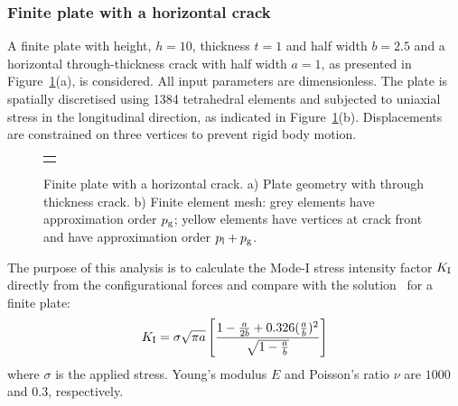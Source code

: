 \documentclass[onecolumn]{svjour3}
\begin{document}
\subsubsection{Finite plate with a horizontal crack}\label{sec:plate_section}
A finite plate with height, $h = 10$, thickness $t=1$ and half width $b = 2.5$ and a horizontal through-thickness crack with half width $a = 1$, as presented in Figure~\ref{fig:plate_load_mesh}(a), is considered. All input parameters are dimensionless. 
The  plate is spatially discretised using 1384 tetrahedral elements and subjected to uniaxial stress in the longitudinal direction, as indicated in Figure~\ref{fig:plate_load_mesh}(b). 
Displacements are constrained on three vertices to prevent rigid body motion.

\begin{figure}[h!]
\begin{center}
\begin{tabular}{c}
{\def\svgwidth{8cm} }\\
\end{tabular}
\caption{Finite plate with a horizontal crack. a) Plate geometry with through thickness crack. b) Finite element mesh: grey elements have approximation order $p_{\rm g}$; yellow elements have vertices at crack front and have approximation order $p_{\rm l}+p_{\rm g}$. }
\label{fig:plate_load_mesh}
\end{center}
\end{figure}

The purpose of this analysis is to calculate the Mode-I stress intensity factor $ K_{\rm I} $ directly from the configurational forces and compare with the solution~\cite{rooke1976compendium} for a finite plate:
\begin{equation}\label{eq:frac_analytical}
K_{\rm I}=\sigma \sqrt{\pi a} \left[  \frac{1 - \frac{a}{2b} + 0.326 (\frac{a}{b})^2 }{\sqrt{1-\frac{a}{b}}}  \right]
\end{equation}
where $\sigma $ is the applied stress. 
Young's modulus $E$ and Poisson's ratio $\nu$ are $1000$ and $0.3$, respectively. 
\end{document}
